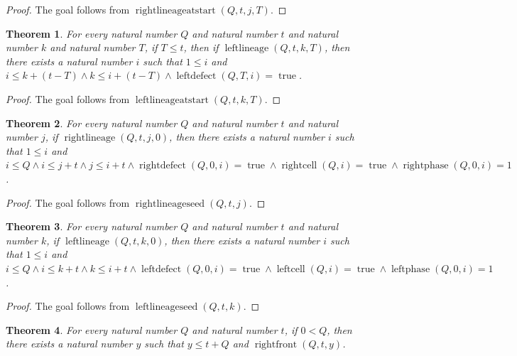 \documentclass[11pt]{article}
\newtheorem{theorem}{Theorem}[section]
\theoremstyle{definition}
\begin{document}
\begin{proof}
The goal follows from \(\operatorname{rightlineageatstart}(Q, t, j, T)\).
\end{proof}
\begin{theorem}
\label{ll:observations:left-lineage-at-start}
For every natural number \(Q\) and natural number \(t\) and natural number \(k\) and natural number \(T\), if \(T \le t\), then if \(\operatorname{leftlineage}(Q, t, k, T)\), then there exists a natural number \(i\) such that \(1 \le i\) and \(i \le k + (t - T) \land k \le i + (t - T) \land \operatorname{leftdefect}(Q, T, i) = \operatorname{true}\).
\end{theorem}
\begin{proof}
The goal follows from \(\operatorname{leftlineageatstart}(Q, t, k, T)\).
\end{proof}
\begin{theorem}
\label{ll:observations:right-lineage-seed}
For every natural number \(Q\) and natural number \(t\) and natural number \(j\), if \(\operatorname{rightlineage}(Q, t, j, 0)\), then there exists a natural number \(i\) such that \(1 \le i\) and \(i \le Q \land i \le j + t \land j \le i + t \land \operatorname{rightdefect}(Q, 0, i) = \operatorname{true} \land \operatorname{rightcell}(Q, i) = \operatorname{true} \land \operatorname{rightphase}(Q, 0, i) = 1\).
\end{theorem}
\begin{proof}
The goal follows from \(\operatorname{rightlineageseed}(Q, t, j)\).
\end{proof}
\begin{theorem}
\label{ll:observations:left-lineage-seed}
For every natural number \(Q\) and natural number \(t\) and natural number \(k\), if \(\operatorname{leftlineage}(Q, t, k, 0)\), then there exists a natural number \(i\) such that \(1 \le i\) and \(i \le Q \land i \le k + t \land k \le i + t \land \operatorname{leftdefect}(Q, 0, i) = \operatorname{true} \land \operatorname{leftcell}(Q, i) = \operatorname{true} \land \operatorname{leftphase}(Q, 0, i) = 1\).
\end{theorem}
\begin{proof}
The goal follows from \(\operatorname{leftlineageseed}(Q, t, k)\).
\end{proof}
\begin{theorem}
\label{ll:observations:exists-right-front}
For every natural number \(Q\) and natural number \(t\), if \(0 < Q\), then there exists a natural number \(y\) such that \(y \le t + Q\) and \(\operatorname{rightfront}(Q, t, y)\).
\end{theorem}
\end{document}
